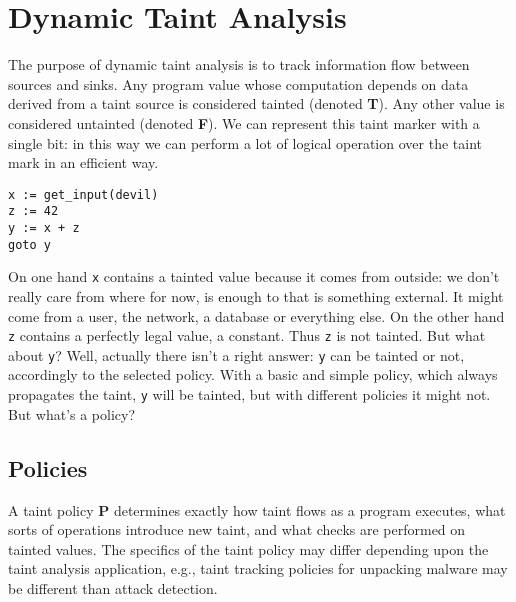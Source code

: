 \section{Dynamic Taint Analysis}
The purpose of dynamic taint analysis is to track information flow between sources and sinks. Any program value whose computation depends on data derived from a taint source is considered tainted (denoted \textbf{T}). Any other value is considered untainted (denoted \textbf{F}). We can represent this taint marker with a single bit: in this way we can perform a lot of logical operation over the taint mark in an efficient way.

\begin{lstlisting}
x := get_input(devil)
z := 42
y := x + z
goto y
\end{lstlisting}

On one hand \texttt{x} contains a tainted value because it comes from outside: we don't really care from where for now, is enough to that is something external. It might come from a user, the network, a database or everything else. On the other hand \texttt{z} contains a perfectly legal value, a constant. Thus \texttt{z} is not tainted. But what about \texttt{y}? Well, actually there isn't a right answer: \texttt{y} can be tainted or not, accordingly to the selected policy. With a basic and simple policy, which always propagates the taint, \texttt{y} will be tainted, but with different policies it might not. \\

But what's a policy?

\subsection{Policies}
A taint policy \textbf{P} determines exactly how taint flows as a program executes, what sorts of operations introduce new taint, and what checks are performed on tainted values. The specifics of the taint policy may differ depending upon the taint analysis application, e.g., taint tracking policies for unpacking malware may be different than attack detection.

